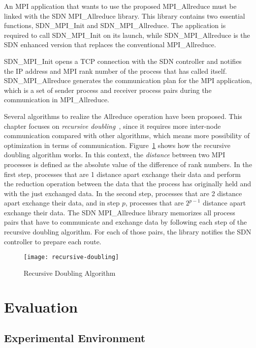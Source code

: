 An MPI application that wants to use the proposed MPI\_Allreduce must be
linked with the SDN MPI\_Allreduce library. This library contains two
essential functions, SDN\_MPI\_Init and SDN\_MPI\_Allreduce. The application
is required to call SDN\_MPI\_Init on its launch, while SDN\_MPI\_Allreduce is
the SDN enhanced version that replaces the conventional MPI\_Allreduce.

SDN\_MPI\_Init opens a TCP connection with the SDN controller and notifies the
IP address and MPI rank number of the process that has called itself.
SDN\_MPI\_Allreduce generates the communication plan for the MPI application,
which is a set of sender process and receiver process pairs during the
communication in MPI\_Allreduce.

Several algorithms to realize the Allreduce operation have been proposed. This
chapter focuses on \emph{recursive doubling}~\autocite{Thakur2005}, since it
requires more inter-node communication compared with other algorithms, which
means more possibility of optimization in terms of communication.
Figure~\ref{fig:recursive-doubling} shows how the recursive doubling algorithm
works. In this context, the \emph{distance} between two MPI processes is
defined as the absolute value of the difference of rank numbers. In the first
step, processes that are 1 distance apart exchange their data and perform the
reduction operation between the data that the process has originally held and
with the just exchanged data. In the second step, processes that are 2
distance apart exchange their data, and in step \(p\), processes that are
\(2^{p - 1}\) distance apart exchange their data. The SDN MPI\_Allreduce
library memorizes all process pairs that have to communicate and exchange data
by following each step of the recursive doubling algorithm. For each of those
pairs, the library notifies the SDN controller to prepare each route.

\begin{figure}
    \centering
    \texttt{[image: recursive-doubling]}
    \caption{Recursive Doubling Algorithm}%
    \label{fig:recursive-doubling}
\end{figure}

\section{Evaluation}\label{sec:iii-evaluation}

\subsection{Experimental Environment}

